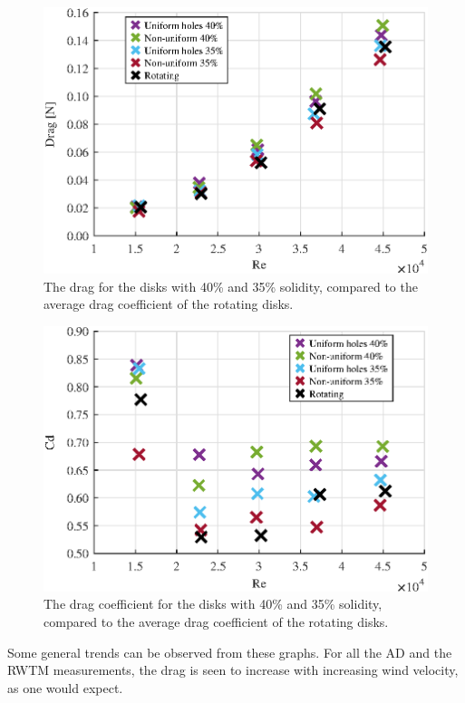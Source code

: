 
\begin{figure}
    \centering
    \includegraphics[width=0.8\linewidth]{0_Images/FortyDragRe.eps}
    \caption{The drag for the disks with 40\% and 35\% solidity, compared to the average drag coefficient of the rotating disks.}
    \label{fig:FortyDrag}
\end{figure}

\begin{figure}
    \centering
    \includegraphics[width=0.8\linewidth]{0_Images/FortyCDRe.eps}
    \caption{The drag coefficient for the disks with 40\% and 35\% solidity, compared to the average drag coefficient of the rotating disks.}
    \label{fig:FortyCD}
\end{figure}



Some general trends can be observed from these graphs. For all the \gls{AD} and the \gls{RWTM} measurements, the drag is seen to increase with increasing wind velocity, as one would expect. 

